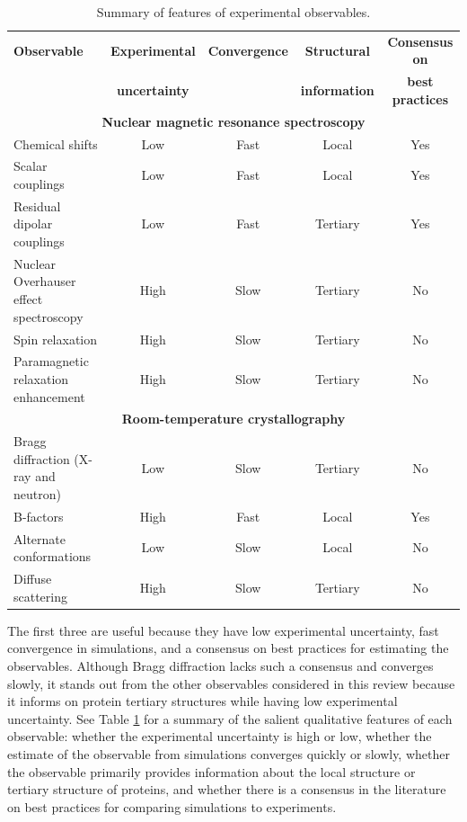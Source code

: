 \documentclass[9pt,review]{livecoms}
\begin{document}
\begin{table}[!ht]
\centering
\begin{tabular}{p{} c c c c}
\toprule
{\bf Observable} & {\bf Experimental} & \bf Convergence & \bf Structural & \bf Consensus on \\
& \bf uncertainty & & \bf information & \bf best practices \\
\midrule
\multicolumn{5}{c}{\bf Nuclear magnetic resonance spectroscopy} \\
\midrule
Chemical shifts & Low & Fast & Local & Yes \\
Scalar couplings & Low & Fast & Local & Yes \\
Residual dipolar couplings & Low & Fast & Tertiary & Yes \\
Nuclear Overhauser effect spectroscopy & High & Slow & Tertiary & No \\
Spin relaxation & High & Slow & Tertiary & No \\
Paramagnetic relaxation enhancement & High & Slow & Tertiary & No \\
\midrule
\multicolumn{5}{c}{\bf Room-temperature crystallography} \\
\midrule
Bragg diffraction (X-ray and neutron) & Low & Slow & Tertiary & No \\
B-factors & High & Fast & Local & Yes \\
Alternate conformations & Low & Slow & Local & No \\
Diffuse scattering & High & Slow & Tertiary & No \\
\bottomrule
\end{tabular}
\caption{Summary of features of experimental observables.}
\label{tab:observables}
\end{table}

The first three are useful because they have low experimental uncertainty, fast convergence in simulations, and a consensus on best practices for estimating the observables.
Although Bragg diffraction lacks such a consensus and converges slowly, it stands out from the other observables considered in this review because it informs on protein tertiary structures while having low experimental uncertainty.
See Table \ref{tab:observables} for a summary of the salient qualitative features of each observable: whether the experimental uncertainty is high or low, whether the estimate of the observable from simulations converges quickly or slowly, whether the observable primarily provides information about the local structure or tertiary structure of proteins, and whether there is a consensus in the literature on best practices for comparing simulations to experiments.
\end{document}
